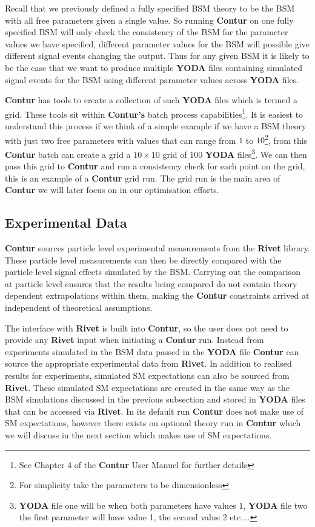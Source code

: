 Recall that we previously defined a fully specified BSM theory to be the BSM with all free parameters given a single value. So running \textbf{Contur} on one fully specified BSM will only check the consistency of the BSM for the parameter values we have specified, different parameter values for the BSM will possible give different signal events changing the output. Thus for any given BSM it is likely to be the case that we want to produce multiple \textbf{YODA} files containing simulated signal events for the BSM using different parameter values across \textbf{YODA} files. 

\textbf{Contur} has tools to create a collection of such \textbf{YODA} files which is termed a grid. These tools sit within \textbf{Contur's} batch process capabilities\footnote{See Chapter 4 of the \textbf{Contur} User Manuel\cite{contur_manuel} for further details}. It is easiest to understand this process if we think of a simple example if we have a BSM theory with just two free parameters with values that can range from $1$ to $10$\footnote{For simplicity take the parameters to be dimensionless}, from this \textbf{Contur} batch can create a grid a $10\times 10$ grid of $100$ \textbf{YODA} files\footnote{\textbf{YODA} file one will be when both parameters have values 1, \textbf{YODA} file two the first parameter will have value 1, the second value 2 etc....}. We can then pass this grid to \textbf{Contur} and run a consistency check for each point on the grid, this is an example of a \textbf{Contur} grid run. The grid run is the main area of \textbf{Contur} we will later focus on in our optimisation efforts.

\subsection{Experimental Data}

\textbf{Contur} sources particle level experimental measurements from the \textbf{Rivet}\cite{Rivet} library. These particle level measurements can then be directly compared with the particle level signal effects simulated by the BSM. Carrying out the comparison at particle level ensures that the results being compared do not contain theory dependent extrapolations within them, making the \textbf{Contur} constraints arrived at independent of theoretical assumptions. 

The interface with \textbf{Rivet} is built into \textbf{Contur}, so the user does not need to provide any \textbf{Rivet} input when initiating a \textbf{Contur} run. Instead from experiments simulated in the BSM data passed in the \textbf{YODA} file \textbf{Contur} can source the appropriate experimental data from \textbf{Rivet}. In addition to realised results for experiments, simulated SM expectations can also be sourced from \textbf{Rivet}. These simulated SM expectations are created in the same way as the BSM simulations discussed in the previous subsection and stored in \textbf{YODA} files that can be accessed via \textbf{Rivet}. In its default run \textbf{Contur} does not make use of SM expectations, however there exists on optional theory run in \textbf{Contur} which we will discuss in the next section which makes use of SM expectations.

